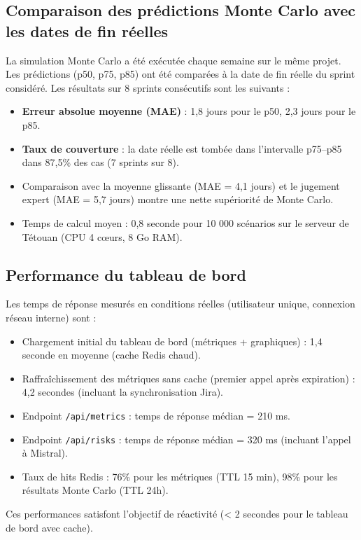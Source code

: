 \subsection{Comparaison des prédictions Monte Carlo avec les dates de fin réelles}
La simulation Monte Carlo a été exécutée chaque semaine sur le même projet. Les prédictions (p50, p75, p85) ont été comparées à la date de fin réelle du sprint considéré. Les résultats sur 8 sprints consécutifs sont les suivants :
\begin{itemize}
    \renewcommand{\labelitemi}{—}
    \item \textbf{Erreur absolue moyenne (MAE)} : 1,8 jours pour le p50, 2,3 jours pour le p85.
    \item \textbf{Taux de couverture} : la date réelle est tombée dans l’intervalle p75–p85 dans 87,5\% des cas (7 sprints sur 8).
    \item Comparaison avec la moyenne glissante (MAE = 4,1 jours) et le jugement expert (MAE = 5,7 jours) montre une nette supériorité de Monte Carlo.
    \item Temps de calcul moyen : 0,8 seconde pour 10 000 scénarios sur le serveur de Tétouan (CPU 4 cœurs, 8 Go RAM).
\end{itemize}

\subsection{Performance du tableau de bord}
Les temps de réponse mesurés en conditions réelles (utilisateur unique, connexion réseau interne) sont :
\begin{itemize}
    \renewcommand{\labelitemi}{—}
    \item Chargement initial du tableau de bord (métriques + graphiques) : 1,4 seconde en moyenne (cache Redis chaud).
    \item Raffraîchissement des métriques sans cache (premier appel après expiration) : 4,2 secondes (incluant la synchronisation Jira).
    \item Endpoint \texttt{/api/metrics} : temps de réponse médian = 210 ms.
    \item Endpoint \texttt{/api/risks} : temps de réponse médian = 320 ms (incluant l’appel à Mistral).
    \item Taux de hits Redis : 76\% pour les métriques (TTL 15 min), 98\% pour les résultats Monte Carlo (TTL 24h).
\end{itemize}
Ces performances satisfont l’objectif de réactivité (< 2 secondes pour le tableau de bord avec cache).

